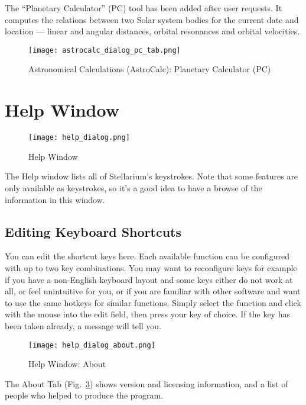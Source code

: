 The ``Planetary Calculator'' (PC) tool has been added after user requests. 
It computes the relations between two Solar system bodies for the current date and location --- linear and angular distances, 
orbital resonances and orbital velocities.

\begin{figure}[htbp]
\centering\texttt{[image: astrocalc\_dialog\_pc\_tab.png]}
\caption{Astronomical Calculations (AstroCalc): Planetary Calculator (PC)}
\label{fig:gui:AstroCalc:PC}
\end{figure}


\newpage 
   
\section{Help Window}
\label{sec:gui:help}

\begin{figure}[htbp]
\centering\texttt{[image: help\_dialog.png]}
\caption{Help Window}
\label{fig:gui:help}
\end{figure}

\noindent The Help window lists all of Stellarium's keystrokes. Note that some
features are only available as keystrokes, so it's a good idea to have
a browse of the information in this window.

\subsection{Editing Keyboard Shortcuts}
\label{sec:gui:help:hotkeys}

You can edit the shortcut keys here. Each available function can be
configured with up to two key combinations. You may want to
reconfigure keys for example if you have a non-English keyboard layout
and some keys either do not work at all, or feel unintuitive for you,
or if you are familiar with other software and want to use the same
hotkeys for similar functions. Simply select the function and click
with the mouse into the edit field, then press your key of choice. If
the key has been taken already, a message will tell you.


\begin{figure}[htbp]
\centering\texttt{[image: help\_dialog\_about.png]}
\caption{Help Window: About}
\label{fig:gui:help:about}
\end{figure}

The About Tab (Fig.~\ref{fig:gui:help:about}) shows version and licensing information, and a list
of people who helped to produce the program.

